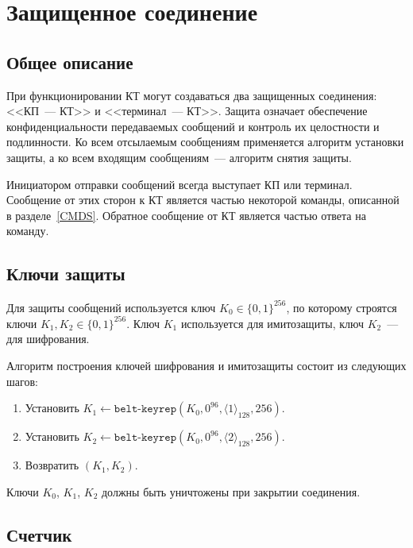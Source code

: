 \section{Защищенное соединение}\label{CRYPTO.SM}

\subsection{Общее описание}

При функционировании КТ могут создаваться два защищенных соединения: <<КП~--- 
КТ>> и <<терминал~--- КТ>>. Защита означает обеспечение конфиденциальности 
передаваемых сообщений и контроль их целостности и подлинности. Ко всем 
отсылаемым сообщениям применяется алгоритм установки защиты, а ко всем входящим 
сообщениям~---  алгоритм снятия защиты.

Инициатором отправки сообщений всегда выступает КП или терминал.
Сообщение от этих сторон к КТ является частью некоторой команды, 
описанной в разделе~\ref{CMDS}. Обратное сообщение от КТ является частью ответа 
на команду.

\subsection{Ключи защиты}

Для защиты сообщений используется ключ $K_0\in\{0,1\}^{256}$, по которому строятся 
ключи $K_1, K_2 \in\{0,1\}^{256}$. Ключ $K_1$ используется для имитозащиты, 
ключ $K_2$~--- для шифрования.

Алгоритм построения ключей шифрования и имитозащиты состоит из следующих шагов:

\begin{enumerate}
\item
Установить 
$K_1\gets\texttt{belt-keyrep}(K_0, 0^{96}, \langle 1 \rangle_{128}, 256)$.

\item
Установить 
$K_2\gets\texttt{belt-keyrep}(K_0, 0^{96}, \langle 2 \rangle_{128}, 256)$.

\item
Возвратить $(K_1, K_2)$.
\end{enumerate}

Ключи $K_0$, $K_1$, $K_2$ должны быть уничтожены при закрытии соединения.

\subsection{Счетчик}\label{CRYPTO.SM.Ctr}

